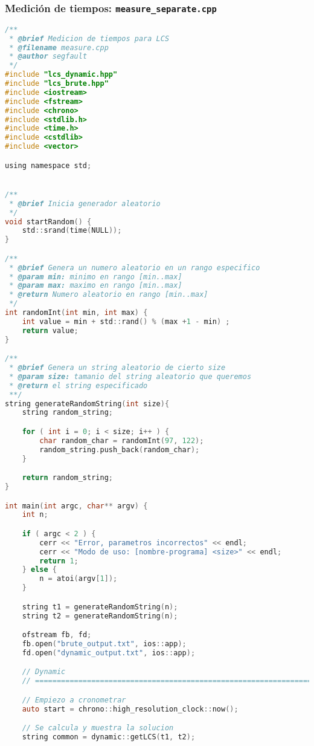 \documentclass[10pt, a4paper]{article}
\theoremstyle{theorem-style}
\theoremstyle{theorem-style}
\theoremstyle{definition-style}
\theoremstyle{remark-style}
\theoremstyle{example-style}
\theoremstyle{definition-style}
\theoremstyle{remark-style}
\begin{document}
\subsubsection*{Medición de tiempos: \texttt{measure\_separate.cpp}}
\begin{lstlisting}[language=C]
/**
 * @brief Medicion de tiempos para LCS
 * @filename measure.cpp
 * @author segfault
 */
#include "lcs_dynamic.hpp"
#include "lcs_brute.hpp"
#include <iostream>
#include <fstream>
#include <chrono>
#include <stdlib.h>
#include <time.h>
#include <cstdlib>
#include <vector>

using namespace std;


/**
 * @brief Inicia generador aleatorio
 */
void startRandom() {
    std::srand(time(NULL));
}

/**
 * @brief Genera un numero aleatorio en un rango especifico
 * @param min: minimo en rango [min..max]
 * @param max: maximo en rango [min..max]
 * @return Numero aleatorio en rango [min..max]
 */
int randomInt(int min, int max) {
    int value = min + std::rand() % (max +1 - min) ;
    return value;
}

/**
 * @brief Genera un string aleatorio de cierto size
 * @param size: tamanio del string aleatorio que queremos
 * @return el string especificado
 **/
string generateRandomString(int size){
    string random_string;

    for ( int i = 0; i < size; i++ ) {
        char random_char = randomInt(97, 122);
        random_string.push_back(random_char);
    }

    return random_string;
}

int main(int argc, char** argv) {
    int n;

    if ( argc < 2 ) {
        cerr << "Error, parametros incorrectos" << endl;
        cerr << "Modo de uso: [nombre-programa] <size>" << endl;
        return 1;
    } else {
        n = atoi(argv[1]);
    }

    string t1 = generateRandomString(n);
    string t2 = generateRandomString(n);

    ofstream fb, fd;
    fb.open("brute_output.txt", ios::app);
    fd.open("dynamic_output.txt", ios::app);

    // Dynamic
    // =========================================================================

    // Empiezo a cronometrar
	auto start = chrono::high_resolution_clock::now(); 

    // Se calcula y muestra la solucion
    string common = dynamic::getLCS(t1, t2);


\end{lstlisting}
\end{document}
